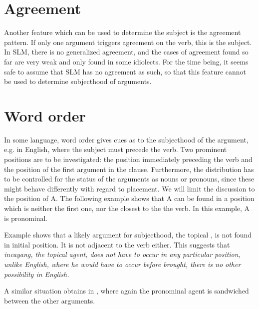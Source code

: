 \section{Agreement}\label{sec:grel:Agreement}
Another feature which can be used to determine the subject is the agreement pattern. If only one argument triggers agreement on the verb, this is the subject. In SLM, there is no generalized agreement, and the cases of agreement found so far  are very weak and only found in some idiolects. For the time being, it seems safe to assume that SLM has no agreement as such, so that this feature cannot be used to determine subjecthood of arguments.

\section{Word order}\label{sec:grel:Wordorder}
In some language, word order gives cues as to the subjecthood of the argument, e.g. in English, where the subject must precede the verb.  Two prominent positions are to be investigated: the position immediately preceding the verb and the position of the first argument in the clause. Furthermore, the distribution has to be controlled for the status of the arguments as nouns or pronouns, since these might behave differently with regard to placement. We will limit the discussion to the position of A. The following example shows that A can be found in a position which is neither the first one, nor the closest to the the verb. In this example, A is pronominal.


Example  shows that a likely argument for subjecthood, the topical , is not found in initial position. It is not adjacent to the verb either. This suggests that \em incayang\em, the topical agent, does not have to occur in any particular position, unlike English, where \em he \em would have to occur before \em brought\em, there is no other possibility in English.

A similar situation obtains in , where again the pronominal agent is sandwiched between the other arguments.

